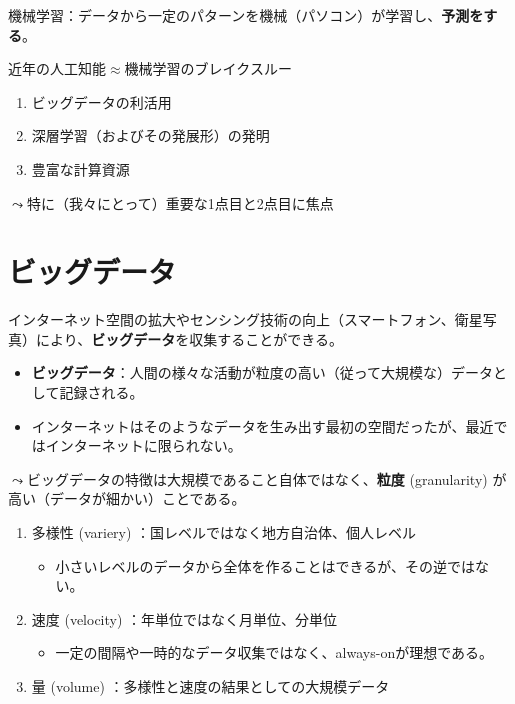 \documentclass[
  xelatex,
  ja=standard]{bxjsarticle}
\providecommand{\tightlist}{%
  \setlength{\itemsep}{0pt}\setlength{\parskip}{0pt}}\usepackage{longtable,booktabs,array}
\begin{document}
機械学習：データから一定のパターンを機械（パソコン）が学習し、\textbf{予測をする}。

近年の人工知能\(\approx\)機械学習のブレイクスルー

\begin{enumerate}
\def\labelenumi{\arabic{enumi}.}
\tightlist
\item
  ビッグデータの利活用
\item
  深層学習（およびその発展形）の発明
\item
  豊富な計算資源
\end{enumerate}

\(\leadsto\)特に（我々にとって）重要な1点目と2点目に焦点

\hypertarget{ux30d3ux30c3ux30b0ux30c7ux30fcux30bf}{%
\section{ビッグデータ}\label{ux30d3ux30c3ux30b0ux30c7ux30fcux30bf}}

インターネット空間の拡大やセンシング技術の向上（スマートフォン、衛星写真）により、\textbf{ビッグデータ}を収集することができる。

\begin{itemize}
\tightlist
\item
  \textbf{ビッグデータ}：人間の様々な活動が粒度の高い（従って大規模な）データとして記録される。
\item
  インターネットはそのようなデータを生み出す最初の空間だったが、最近ではインターネットに限られない。
\end{itemize}

\(\leadsto\)ビッグデータの特徴は大規模であること自体ではなく、\textbf{粒度}
(granularity) が高い（データが細かい）ことである。

\begin{enumerate}
\def\labelenumi{\arabic{enumi}.}
\tightlist
\item
  多様性 (variery) ：国レベルではなく地方自治体、個人レベル

  \begin{itemize}
  \tightlist
  \item
    小さいレベルのデータから全体を作ることはできるが、その逆ではない。
  \end{itemize}
\item
  速度 (velocity) ：年単位ではなく月単位、分単位

  \begin{itemize}
  \tightlist
  \item
    一定の間隔や一時的なデータ収集ではなく、always-onが理想である。
  \end{itemize}
\item
  量 (volume) ：多様性と速度の結果としての大規模データ
\end{enumerate}
\end{document}
